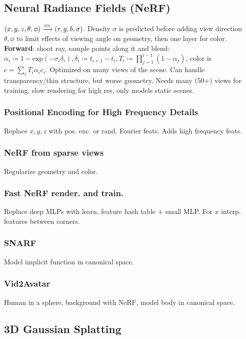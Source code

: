 \documentclass[11pt,landscape,a4paper,fleqn]{article}
\renewcommand{\exp}{\mathrm{exp}}
\begin{document}
\begin{multicols*}{4}
\subsection{Neural Radiance Fields (NeRF)} \phantom{a}

$(x, y, z, \theta, \phi) \xrightarrow{\textsc{nn}} (r, g, b, \sigma)$.
Density $\sigma$ is predicted before adding view direction $\theta, \phi$ to limit effects of viewing angle on geometry,
then one layer for color.
\textbf{Forward}: shoot ray, sample points along it and blend:
$\alpha_i \coloneqq 1 - \exp( - \sigma_i \delta_i), \delta_i \coloneqq t_{i+1} - t_i,
T_i \coloneqq \prod_{j = 1}^{i-1}(1 - \alpha_j)$,
color is $c = \sum_i T_i \alpha_i c_i$.
Optimized on many views of the scene.
Can handle transparency/thin structure,
but worse geometry.
Needs many (50+) views for training, slow rendering for high res,
only models static scenes.

\subsubsection{Positional Encoding for High Frequency Details}
Replace $x, y, z$ with pos. enc. or rand. Fourier feats.
Adds high frequency feats.

\subsubsection{NeRF from sparse views} Regularize geometry and color.

\subsubsection{Fast NeRF render. and train.}
Replace deep MLPs with learn. feature hash table + small MLP.
For $x$ interp. features between corners.

\subsubsection{SNARF}
Model implicit function in canonical space.

\subsubsection{Vid2Avatar} Human in a sphere, background with NeRF, model body in canonical space.

\subsection{3D Gaussian Splatting}


\end{multicols*}
\end{document}
